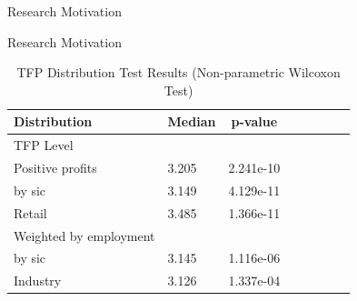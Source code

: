 \documentclass[11pt]{beamer}
\begin{document}
\begin{frame}{Research Motivation}
	\begin{center}
	\begin{figure}\centering\label{Ratio_emp}
	\end{figure}
	\end{center}
\end{frame}

\begin{frame}{Research Motivation}
\begin{table}
\caption*{TFP Distribution Test Results (Non-parametric Wilcoxon Test)} 
\centering
\begin{tabular}{l llp{1.5cm} p{0.5cm} llp{1.5cm}}
\toprule
Distribution & \multicolumn{1}{c}{Median} & \multicolumn{1}{c}{p-value} \\ 
\midrule
TFP Level\\
\; Positive profits & 3.205 & 2.241e-10\\
\;\;\; by sic & 3.149 & 4.129e-11\\
\;\;\; Retail & 3.485 & 1.366e-11\\
\; Weighted by employment\\
\;\;\; by sic & 3.145 & 1.116e-06\\
\;\;\; Industry & 3.126 & 1.337e-04\\
\bottomrule
\end{tabular}
\end{table}
\end{frame}
\end{document}
